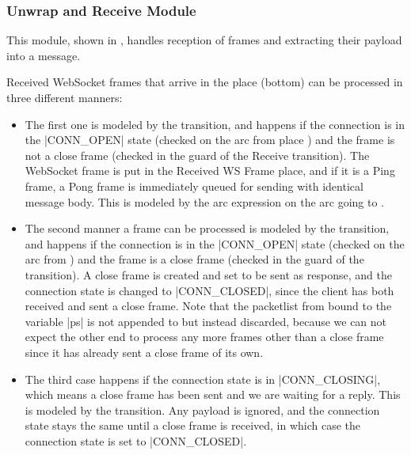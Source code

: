 	\subsubsection{Unwrap and Receive Module}
		
		
		This module, shown in , handles reception of
		frames and extracting their payload into a message.
		
		Received WebSocket frames that arrive in the  place 
		(bottom) can be processed in three different manners:
		
		\begin{itemize}
			\item The first one is modeled by the  transition, and
			happens if the connection is in the |CONN_OPEN| state (checked on the arc
			from place ) and the frame is not a close frame
			(checked in the guard of the Receive transition). The WebSocket frame is put
			in the Received WS Frame place, and if it is a Ping frame, a Pong frame is
			immediately queued for sending with identical message body. This is modeled
			by the arc expression on the arc going to .
			
			\item The second manner a frame can be processed is modeled by the
			 transition, and happens if the connection is in the
			|CONN_OPEN| state (checked on the arc from ) and the frame is a close frame (checked in the guard of the  transition). A close frame is
			created and set to be sent as response, and the connection state is changed
			to |CONN_CLOSED|, since the client has both received and sent a close
			frame. Note that the packetlist from  bound to the
			variable |ps| is not appended to but instead discarded, because we can not
			expect the other end to process any more frames other than a close frame
			since it has already sent a close frame of its own.
			
			\item The third case happens if the connection state is in
			|CONN_CLOSING|, which means a close frame has been sent and we are
			waiting for a reply. This is modeled by the 
			transition. Any payload is ignored, and the connection state stays the same
			until a close frame is received, in which case the connection state is set to |CONN_CLOSED|. 
		\end{itemize}
		

